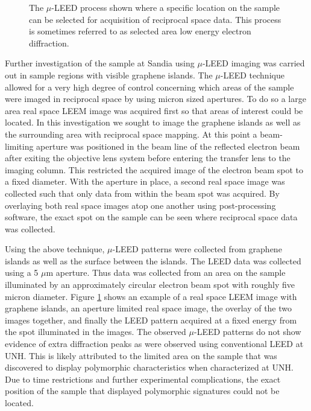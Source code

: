 \begin{figure}
{  }
  \caption{
  The $\mu$-LEED process shown where a specific location on the sample can be selected for acquisition of reciprocal space data. This process is sometimes referred to as selected area low energy electron diffraction.
  }
  \label{fig:microleed}
 \end{figure}

Further investigation of the sample at Sandia using $\mu$-LEED imaging was carried out in sample regions with visible graphene islands. The $\mu$-LEED technique allowed for a very high degree of control concerning which areas of the sample were imaged in reciprocal space by using micron sized apertures. To do so a large area real space LEEM image was acquired first so that areas of interest could be located. In this investigation we sought to image the graphene islands as well as the surrounding area with reciprocal space mapping. At this point a beam-limiting aperture was positioned in the beam line of the reflected electron beam after exiting the objective lens system before entering the transfer lens to the imaging column. This restricted the acquired image of the electron beam spot to a fixed diameter. With the aperture in place, a second real space image was collected such that only data from within the beam spot was acquired. By overlaying both real space images atop one another using post-processing software, the exact spot on the sample can be seen where reciprocal space data was collected.

Using the above technique, $\mu$-LEED patterns were collected from graphene islands as well as the surface between the islands. The LEED data was collected using a 5 $\mu$m aperture. Thus data was collected from an area on the sample illuminated by an approximately circular electron beam spot with roughly five micron diameter. Figure \ref{fig:microleed} shows an example of a real space LEEM image with graphene islands, an aperture limited real space image, the overlay of the two images together, and finally the LEED pattern acquired at a fixed energy from the spot illuminated in the images. The observed $\mu$-LEED patterns do not show evidence of extra diffraction peaks as were observed using conventional LEED at UNH. This is likely attributed to the limited area on the sample that was discovered to display polymorphic characteristics when characterized at UNH. Due to time restrictions and further experimental complications, the exact position of the sample that displayed polymorphic signatures could not be located.

